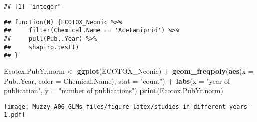 \documentclass[]{article}
\newenvironment{Shaded}{\begin{snugshade}}{\end{snugshade}}
\newcommand{\KeywordTok}[1]{\textcolor[rgb]{0.13,0.29,0.53}{\textbf{#1}}}
\newcommand{\DataTypeTok}[1]{\textcolor[rgb]{0.13,0.29,0.53}{#1}}
\newcommand{\StringTok}[1]{\textcolor[rgb]{0.31,0.60,0.02}{#1}}
\newcommand{\CommentTok}[1]{\textcolor[rgb]{0.56,0.35,0.01}{\textit{#1}}}
\newcommand{\ControlFlowTok}[1]{\textcolor[rgb]{0.13,0.29,0.53}{\textbf{#1}}}
\newcommand{\OperatorTok}[1]{\textcolor[rgb]{0.81,0.36,0.00}{\textbf{#1}}}
\newcommand{\NormalTok}[1]{#1}
\begin{document}
\begin{verbatim}
## [1] "integer"
\end{verbatim}

\begin{Shaded}
\end{Shaded}

\begin{verbatim}
## function(N) {ECOTOX_Neonic %>%
##     filter(Chemical.Name == 'Acetamiprid') %>%
##     pull(Pub..Year) %>%
##     shapiro.test()
## }
\end{verbatim}

\begin{Shaded}
\begin{Highlighting}[]
\NormalTok{Ecotox.PubYr.norm <-}\StringTok{ }\KeywordTok{ggplot}\NormalTok{(ECOTOX_Neonic) }\OperatorTok{+}
\KeywordTok{geom_freqpoly}\NormalTok{(}\KeywordTok{aes}\NormalTok{(}\DataTypeTok{x =}\NormalTok{ Pub..Year, }\DataTypeTok{color =}\NormalTok{ Chemical.Name), }\DataTypeTok{stat =} \StringTok{"count"}\NormalTok{) }\OperatorTok{+}
\StringTok{  }\KeywordTok{labs}\NormalTok{(}\DataTypeTok{x =} \StringTok{"year of publication"}\NormalTok{, }\DataTypeTok{y =} \StringTok{"number of publications"}\NormalTok{)}
\KeywordTok{print}\NormalTok{(Ecotox.PubYr.norm)}
\end{Highlighting}
\end{Shaded}

\texttt{[image: Muzzy\_A06\_GLMs\_files/figure-latex/studies in different years-1.pdf]}

\begin{Shaded}
\end{Shaded}
\end{document}
